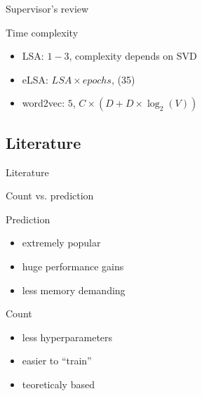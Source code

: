 \documentclass[xcolor={table}]{beamer}
\begin{document}
\begin{frame}{Supervisor's review}
    \begin{block}{Time complexity}
        \begin{itemize}
            \item LSA: $1-3$, complexity depends on SVD
            \item eLSA: $LSA \times epochs$, (35)
            \item word2vec: $5$, $C \times (D + D \times \log_2(V))$
        \end{itemize}
    \end{block}
\end{frame}

\appendix
\subsection{Literature}                
\begin{frame}[allowframebreaks]{Literature}
\footnotesize
    \nocite{*}
    
     
\end{frame}

\begin{frame}{Count vs. prediction}
    \begin{block}{Prediction}
        \begin{itemize}
            \item extremely popular
            \item huge performance gains
            \item less memory demanding
        \end{itemize}
    \end{block}

    \begin{block}{Count}
        \begin{itemize}
            \item less hyperparameters
            \item easier to ``train''
            \item teoreticaly based
        \end{itemize}
    \end{block}
\end{frame}
\end{document}
